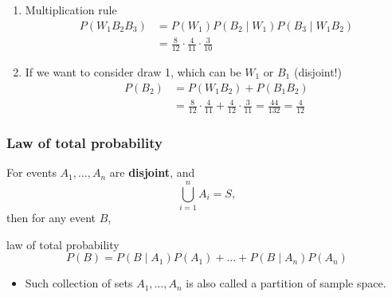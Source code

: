 \documentclass[slidestop,compress,mathserif]{beamer}
\begin{document}
\begin{frame}%

\pause
\begin{enumerate}
\item Multiplication rule
\begin{align*}
P(W_1B_2B_3) & = P(W_1) P(B_2 \mid W_1) P(B_3 \mid W_1B_2)\\
			& = \frac{8}{12}\cdot \frac{4}{11} \cdot \frac{3}{10}
\end{align*}
\vspace{-0.3cm}
\pause
\item If we want to consider draw 1, which can be $W_1$ or $B_1$ (disjoint!)
\begin{align*}
P(B_2) & = P(W_1B_2) + P(B_1B_2)\\
			& = \frac{8}{12}\cdot \frac{4}{11} + \frac{4}{12} \cdot \frac{3}{11}
			 = \frac{44}{132} = \frac{4}{12}
\end{align*}

\end{enumerate}
\end{frame}



\begin{frame}\frametitle{Law of total probability}

For events $A_1,\ldots,A_n$  are {\bf disjoint}, and
\[ \bigcup_{i=1}^n A_i = S,\]
then for any event $B$, \pause
\begin{dinglist}{\DingListSymbolA}
\item  law of total probability
\[P(B)=P(B \mid A_1)P(A_1)+\ldots+P(B \mid A_n)P(A_n)\]
\end{dinglist}
\pause
\begin{itemize}
\item Such collection of sets $A_1,\ldots,A_n$ is also called a partition of sample space.
\end{itemize}

\end{frame}
\end{document}
